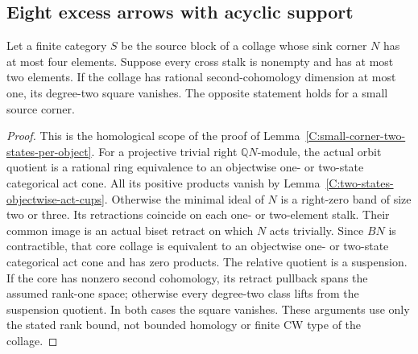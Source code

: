 \subsection{Eight excess arrows with acyclic support}

\begin{lemma}
\label{C:small-corner-two-stalks-rank-one}
Let a finite category $S$ be the source block of a collage
whose sink corner $N$ has at most four elements.  Suppose
every cross stalk is nonempty and has at most two elements.
If the collage has rational second-cohomology dimension at
most one, its degree-two square vanishes.  The opposite
statement holds for a small source corner.
\end{lemma}
\begin{proof}
This is the homological scope of the proof of
Lemma~\ref{C:small-corner-two-states-per-object}.
For a projective trivial right $\mathbb QN$-module, the
actual orbit quotient is a rational ring equivalence to
an objectwise one- or two-state categorical act cone.
All its positive products vanish by
Lemma~\ref{C:two-states-objectwise-act-cups}.
Otherwise the minimal ideal of $N$ is a right-zero band
of size two or three.  Its retractions coincide on each
one- or two-element stalk.  Their common image is an actual
biset retract on which $N$ acts trivially.  Since $BN$ is
contractible, that core collage is equivalent to an
objectwise one- or two-state categorical act cone and
has zero products.  The relative quotient is a suspension.
If the core has nonzero second cohomology, its retract
pullback spans the assumed rank-one space; otherwise every
degree-two class lifts from the suspension quotient.
In both cases the square vanishes.  These arguments use
only the stated rank bound, not bounded homology or finite
CW type of the collage.
\end{proof}

